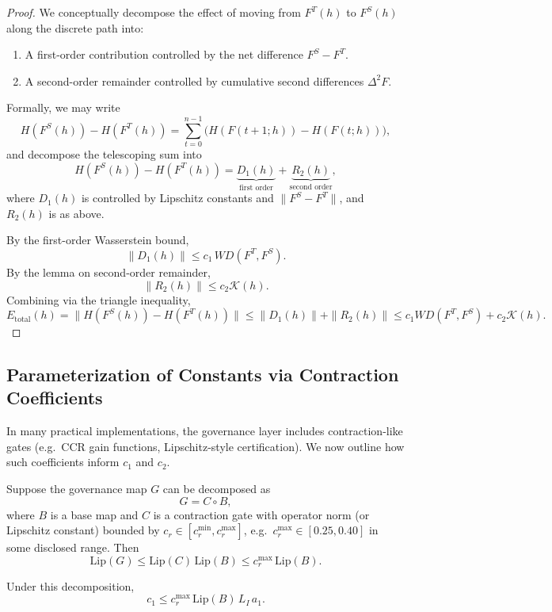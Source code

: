 \documentclass[11pt]{article}
\theoremstyle{definition}
\theoremstyle{plain}
\theoremstyle{remark}
\begin{document}
\begin{proof}
We conceptually decompose the effect of moving from \(F^T(h)\) to \(F^S(h)\) along the discrete path into:
\begin{enumerate}[leftmargin=2em]
  \item A first-order contribution controlled by the net difference \(F^S - F^T\).
  \item A second-order remainder controlled by cumulative second differences \(\Delta^2 F\).
\end{enumerate}
Formally, we may write
\[
  H(F^S(h)) - H(F^T(h))
  = \sum_{t=0}^{n-1} \big( H(F(t+1;h)) - H(F(t;h)) \big),
\]
and decompose the telescoping sum into
\[
  H(F^S(h)) - H(F^T(h)) = \underbrace{D_1(h)}_{\text{first order}} + \underbrace{R_2(h)}_{\text{second order}},
\]
where \(D_1(h)\) is controlled by Lipschitz constants and \(\|F^S-F^T\|\), and \(R_2(h)\) is as above.

By the first-order Wasserstein bound,
\[
  \|D_1(h)\| \le c_1\, WD(F^T,F^S).
\]
By the lemma on second-order remainder,
\[
  \|R_2(h)\| \le c_2 \mathcal{K}(h).
\]
Combining via the triangle inequality,
\[
  E_{\text{total}}(h)
  = \|H(F^S(h)) - H(F^T(h))\|
  \le \|D_1(h)\| + \|R_2(h)\|
  \le c_1 WD(F^T,F^S) + c_2 \mathcal{K}(h).
\]
\end{proof}

\subsection{Parameterization of Constants via Contraction Coefficients}

In many practical implementations, the governance layer includes contraction-like gates (e.g.\ CCR gain functions, Lipschitz-style certification). We now outline how such coefficients inform \(c_1\) and \(c_2\).

\begin{aassump}
Suppose the governance map \(G\) can be decomposed as
\[
  G = C \circ B,
\]
where \(B\) is a base map and \(C\) is a contraction gate with operator norm (or Lipschitz constant) bounded by \(c_r\in[c_r^{\min},c_r^{\max}]\), e.g.\ \(c_r^{\max}\in[0.25,0.40]\) in some disclosed range. Then
\[
  \text{Lip}(G) \le \text{Lip}(C)\,\text{Lip}(B) \le c_r^{\max} \,\text{Lip}(B).
\]
\end{aassump}

\begin{aprop}
Under this decomposition,
\[
  c_1 \le c_r^{\max} \, \text{Lip}(B)\, L_I \, a_1.
\]
\end{aprop}
\end{document}
